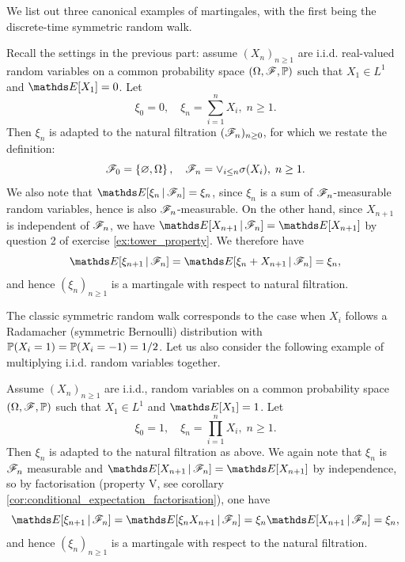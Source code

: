 We list out three canonical examples of martingales, with the first being the discrete-time symmetric random walk.

\begin{example} \label{eg:discrete_time_random_walk}
Recall the settings in the previous part: assume $(X_n)_{n\geq 1}$ are i.i.d. real-valued random variables on a common probability space $(\Omega,\mathcal{F},\mathbb{P})$ such that $X_1 \in L^1$ and $\E[X_1] = 0$. Let 
\begin{equation*}
    \xi_0 = 0, \quad \xi_n = \sum_{i=1}^n X_i, \; n\geq 1.
\end{equation*}
Then $\xi_n$ is adapted to the natural filtration $(\mathcal{F}_n)_{n\geq 0}$, for which we restate the definition:
\begin{equation*}
    \mathcal{F}_0 = \left\{ \varnothing, \Omega \right \}, \quad \mathcal{F}_n = \vee_{i\leq n} \sigma(X_i), \; n\geq 1.
\end{equation*}
We also note that $\E[\xi_n \,|\, \F_n] = \xi_n$, since $\xi_n$ is a sum of $\mathcal{F}_n$-measurable random variables, hence is also $\mathcal{F}_n$-measurable. On the other hand, since $X_{n+1}$ is independent of $\mathcal{F}_n$, we have $\E[X_{n+1} \,|\, \F_n] = \E[X_{n+1}]$ by question 2 of exercise \ref{ex:tower_property}. We therefore have
\begin{equation*}
    \E[\xi_{n+1} \,|\, \F_n] = \E[\xi_n + X_{n+1} \,|\, \F_n] = \xi_n,
\end{equation*}
and hence $(\xi_n)_{n\geq 1}$ is a martingale with respect to natural filtration.
\end{example}

The classic symmetric random walk corresponds to the case when $X_i$ follows a Radamacher (symmetric Bernoulli) distribution with $\mathbb{P}(X_i = 1) = \mathbb{P}(X_i = -1) = 1/2$. Let us also consider the following example of multiplying i.i.d. random variables together.

\begin{example} \label{eg:product_of_indpt_rv}
Assume $(X_n)_{n\geq 1}$ are i.i.d., random variables on a common probability space $(\Omega,\mathcal{F},\mathbb{P})$ such that $X_1 \in L^1$ and $\E[X_1] = 1$. Let 
\begin{equation*}
    \xi_0 = 1, \quad \xi_n = \prod_{i=1}^n X_i, \; n\geq 1.
\end{equation*}
Then $\xi_n$ is adapted to the natural filtration as above. We again note that $\xi_n$ is $\mathcal{F}_n$  measurable and $\E[X_{n+1} \,|\, \F_n] = \E[X_{n+1}]$ by independence, so by factorisation (property V, see corollary \ref{cor:conditional_expectation_factorisation}), one have
\begin{equation*}
    \E[\xi_{n+1} \,|\, \F_n] = \E[\xi_n X_{n+1} \,|\, \F_n] = \xi_n \E[ X_{n+1} \,|\, \F_n] = \xi_n,
\end{equation*}
and hence $(\xi_n)_{n\geq 1}$ is a martingale with respect to the natural filtration.
\end{example}

